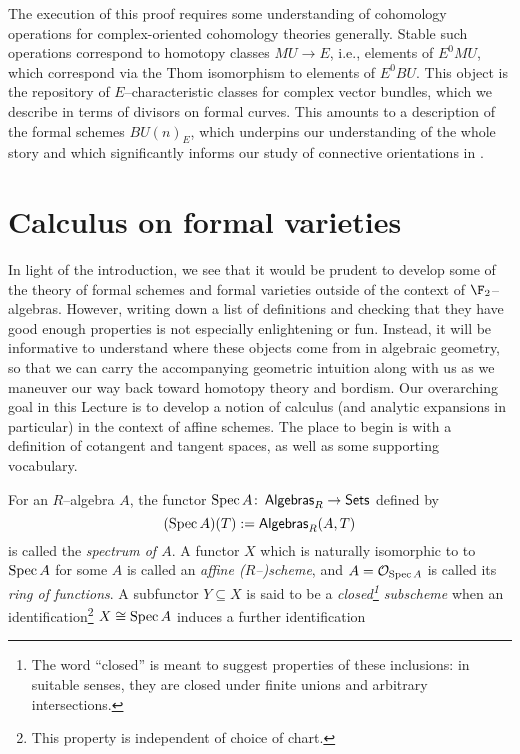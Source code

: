 The execution of this proof requires some understanding of cohomology operations for complex-oriented cohomology theories generally.  Stable such operations correspond to homotopy classes $MU \to E$, i.e., elements of $E^0 MU$, which correspond via the Thom isomorphism to elements of $E^0 BU$.  This object is the repository of $E$--characteristic classes for complex vector bundles, which we describe in terms of divisors on formal curves.  This amounts to a description of the formal schemes $BU(n)_E$, which underpins our understanding of the whole story and which significantly informs our study of connective orientations in .









\section{Calculus on formal varieties}\label{FormalVarietiesLecture}

In light of the introduction, we see that it would be prudent to develop some of the theory of formal schemes and formal varieties outside of the context of $\F_2$--algebras.  However, writing down a list of definitions and checking that they have good enough properties is not especially enlightening or fun.  Instead, it will be informative to understand where these objects come from in algebraic geometry, so that we can carry the accompanying geometric intuition along with us as we maneuver our way back toward homotopy theory and bordism.  Our overarching goal in this Lecture is to develop a notion of calculus (and analytic expansions in particular) in the context of affine schemes.  The place to begin is with a definition of cotangent and tangent spaces, as well as some supporting vocabulary.
\begin{definition}
For an $R$--algebra $A$, the functor $\operatorname{Spec} A \colon\thinspace \mathsf{Algebras}_R \to \mathsf{Sets}$ defined by \[(\operatorname{Spec} A)(T) := \mathsf{Algebras}_R(A, T)\] is called the \textit{spectrum of $A$}.  A functor $X$ which is naturally isomorphic to to $\operatorname{Spec} A$ for some $A$ is called an \textit{affine ($R$--)scheme}, and $A = \mathcal{O}_{\operatorname{Spec} A}$ is called its \textit{ring of functions}.  A subfunctor $Y \subseteq X$ is said to be a \textit{closed\footnote{The word ``closed'' is meant to suggest properties of these inclusions: in suitable senses, they are closed under finite unions and arbitrary intersections.} subscheme} when an identification\footnote{This property is independent of choice of chart.} $X \cong \operatorname{Spec} A$ induces a further identification
\begin{center}
\end{center}
\end{definition}

